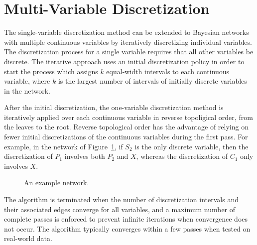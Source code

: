 %     
%     


\section{Multi-Variable Discretization}
\label{sec:multi_var}

The single-variable discretization method can be extended to Bayesian networks with multiple continuous variables by iteratively discretizing individual variables.
The discretization process for a single variable requires that all other variables be discrete.
The iterative approach uses an initial discretization policy in order to start the process which assigns $k$ equal-width intervals to each continuous variable, where $k$ is the largest number of intervals of initially discrete variables in the network.

After the initial discretization, the one-variable discretization method is iteratively applied over each continuous variable in reverse topoligical order, from the leaves to the root.
Reverse topological order has the advantage of relying on fewer initial discretizations of the continuous variables during the first pass.
For example, in the network of Figure~\ref{fig:example_networks}, if $S_2$ is the only discrete variable, then the discretization of $P_1$ involves both $P_2$ and $X$, whereas the discretization of $C_1$ only involves $X$.

\begin{figure}[ht]
 \centering
     
  \caption{An example network.}
   \label{fig:example_networks}
\end{figure}

The algorithm is terminated when the number of discretization intervals and their associated edges converge for all variables, and a maximum number of complete passes is enforced to prevent infinite iterations when convergence does not occur.
The algorithm typically converges within a few passes when tested on real-world data.

